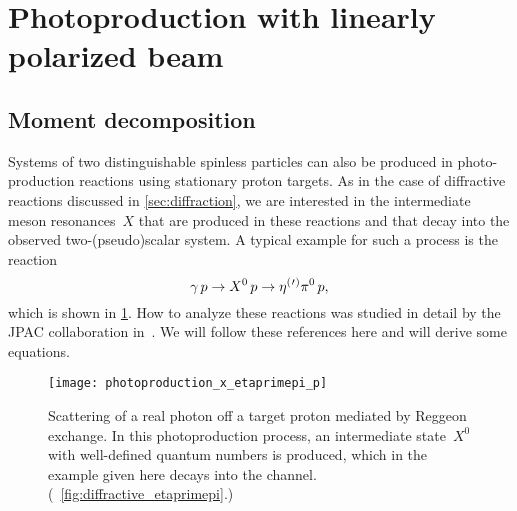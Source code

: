 \section{Photoproduction with linearly polarized beam}%
\label{sec:photoprod}

\subsection{Moment decomposition}%
\label{sec:photoprod:moment}

Systems of two distinguishable spinless particles can also be produced
in photo-production reactions using stationary proton targets.  As in
the case of diffractive reactions discussed in \cref{sec:diffraction},
we are interested in the intermediate meson resonances~$X$ that are
produced in these reactions and that decay into the observed
two-(pseudo)scalar system.  A typical example for such a process is
the reaction
\begin{equation}
  \gamma\, p \to X^0\, p \to \etaOrPr\pi^0\, p,
\end{equation}
which is shown in \cref{fig:photoprod_etaprimepi}.  How to analyze
these reactions was studied in detail by the JPAC collaboration
in~.  We will follow these
references here and will derive some equations.

\begin{figure}[tbp]
  \centering%
  \texttt{[image: photoproduction\_x\_etaprimepi\_p]}%
  \caption{Scattering of a real photon off a target proton mediated by
  Reggeon exchange.  In this photoproduction process, an intermediate
  state~$X^0$ with well-defined quantum numbers is produced, which in
  the example given here decays into the \etaOrPrPim channel.
  (\Confer~\cref{fig:diffractive_etaprimepi}.)}%
  \label{fig:photoprod_etaprimepi}%
\end{figure}

